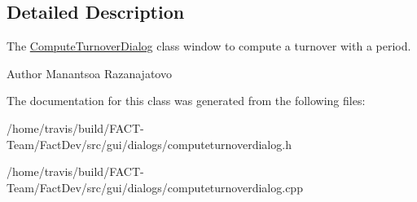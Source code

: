 \subsection{Detailed Description}
The \hyperlink{classGui_1_1Dialogs_1_1ComputeTurnoverDialog}{Compute\-Turnover\-Dialog} class window to compute a turnover with a period. 

\begin{DoxyAuthor}{Author}
Manantsoa Razanajatovo 
\end{DoxyAuthor}


The documentation for this class was generated from the following files\-:\begin{DoxyCompactItemize}
\item 
/home/travis/build/\-F\-A\-C\-T-\/\-Team/\-Fact\-Dev/src/gui/dialogs/computeturnoverdialog.\-h\item 
/home/travis/build/\-F\-A\-C\-T-\/\-Team/\-Fact\-Dev/src/gui/dialogs/computeturnoverdialog.\-cpp\end{DoxyCompactItemize}
